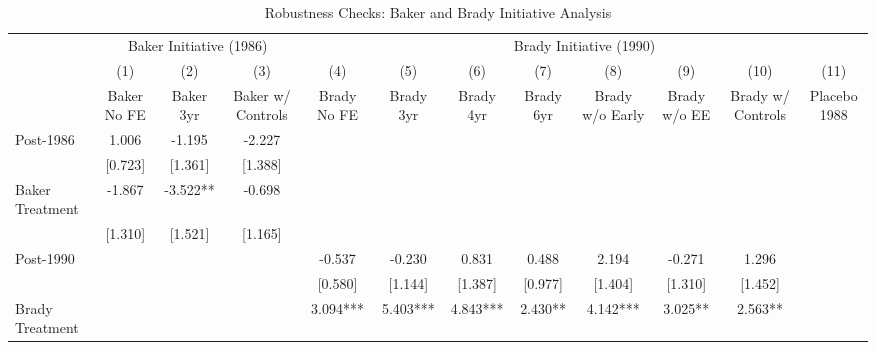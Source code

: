 \begin{table}[htbp]\centering
\def\sym#1{\ifmmode^{#1}\else\(^{#1}\)\fi}
\caption{Robustness Checks: Baker and Brady Initiative Analysis}
\begin{tabular}{l*{11}{c}}
\toprule
                &\multicolumn{3}{c}{Baker Initiative (1986)}&\multicolumn{8}{c}{Brady Initiative (1990)}                                                            \\\cmidrule(lr){2-4}\cmidrule(lr){5-12}
                &\multicolumn{1}{c}{(1)}&\multicolumn{1}{c}{(2)}&\multicolumn{1}{c}{(3)}&\multicolumn{1}{c}{(4)}&\multicolumn{1}{c}{(5)}&\multicolumn{1}{c}{(6)}&\multicolumn{1}{c}{(7)}&\multicolumn{1}{c}{(8)}&\multicolumn{1}{c}{(9)}&\multicolumn{1}{c}{(10)}&\multicolumn{1}{c}{(11)}\\
                &\multicolumn{1}{c}{Baker No FE}&\multicolumn{1}{c}{Baker 3yr}&\multicolumn{1}{c}{Baker w/ Controls}&\multicolumn{1}{c}{Brady No FE}&\multicolumn{1}{c}{Brady 3yr}&\multicolumn{1}{c}{Brady 4yr}&\multicolumn{1}{c}{Brady 6yr}&\multicolumn{1}{c}{Brady w/o Early}&\multicolumn{1}{c}{Brady w/o EE}&\multicolumn{1}{c}{Brady w/ Controls}&\multicolumn{1}{c}{Placebo 1988}\\
\midrule
Post-1986       &    1.006   &   -1.195   &   -2.227   &            &            &            &            &            &            &            &            \\
                &  [0.723]   &  [1.361]   &  [1.388]   &            &            &            &            &            &            &            &            \\
Baker Treatment &   -1.867   &   -3.522** &   -0.698   &            &            &            &            &            &            &            &            \\
                &  [1.310]   &  [1.521]   &  [1.165]   &            &            &            &            &            &            &            &            \\
Post-1990       &            &            &            &   -0.537   &   -0.230   &    0.831   &    0.488   &    2.194   &   -0.271   &    1.296   &            \\
                &            &            &            &  [0.580]   &  [1.144]   &  [1.387]   &  [0.977]   &  [1.404]   &  [1.310]   &  [1.452]   &            \\
Brady Treatment &            &            &            &    3.094***&    5.403***&    4.843***&    2.430** &    4.142***&    3.025** &    2.563** &            \\

\end{tabular}
\end{table}
